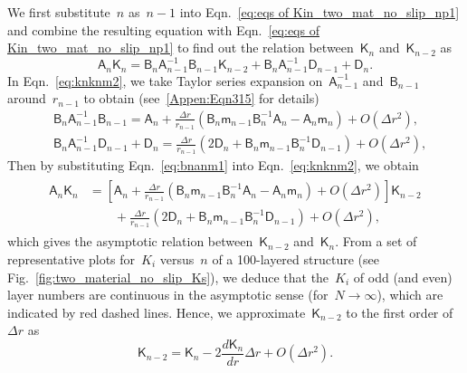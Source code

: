 \documentclass[preprint,10pt,times]{elsarticle}
\numberwithin{equation}{section}
\renewcommand{\u}[1]{\boldsymbol{#1}}
\newcommand{\usf}[1]{\u{\mathsf #1}}
\renewcommand{\>}{$\Rightarrow$}
\begin{document}
We first substitute~$n$ as~$n-1$ into Eqn.~\eqref{eq:eqs of Kin_two_mat_no_slip_np1} and combine the resulting equation with Eqn.~\eqref{eq:eqs of Kin_two_mat_no_slip_np1} to find out the relation between~$\usf{K}_{n}$ and~$\usf{K}_{n-2}$ as
\begin{equation}
	\usf{A}_n \usf{K}_n  = \usf{B}_n \usf{A}^{-1}_{n-1} \usf{B}_{n-1} \usf{K}_{n-2} + \usf{B}_n \usf{A}^{-1}_{n-1} \usf{D}_{n-1}  + \usf{D}_n .
	\label{eq:knknm2}
\end{equation}
In Eqn.~\eqref{eq:knknm2}, we take Taylor series expansion on~$\usf{A}^{-1}_{n-1}$ and~$\usf{B}_{n-1}$ around~$r_{n-1}$ to obtain (see~\ref{Appen:Eqn315} for details)
\begin{subequations}
	\begin{align}
	& \usf{B}_n \usf{A}^{-1}_{n-1} \usf{B}_{n-1} = \usf{A}_n + \frac{\Delta r}{r_{n-1}} \left( \usf{B}_n \usf{m}_{n-1} \usf{B}^{-1}_n \usf{A}_n - \usf{A}_n \usf{m}_n \right)  + O(\Delta r^2), \\
	& \usf{B}_n \usf{A}^{-1}_{n-1} \usf{D}_{n-1} + \usf{D}_n = \frac{\Delta r}{r_{n-1}} \left( 2\usf{D}_n + \usf{B}_n \usf{m}_{n-1} \usf{B}^{-1}_n \usf{D}_{n-1} \right) + O(\Delta r^2),
	\end{align}
	\label{eq:bnanm1}
\end{subequations}
Then by substituting Eqn.~\eqref{eq:bnanm1} into Eqn.~\eqref{eq:knknm2}, we obtain
\begin{equation}
\begin{aligned}
	\begin{split}
	\usf{A}_n \usf{K}_n & = \left[  \usf{A}_n + \frac{\Delta r}{r_{n-1}} \left( \usf{B}_n \usf{m}_{n-1} \usf{B}^{-1}_n \usf{A}_n - \usf{A}_n \usf{m}_n \right)  + O(\Delta r^2) \right] \usf{K}_{n-2} \\
	& \qquad + \frac{\Delta r}{r_{n-1}} \left( 2\usf{D}_n + \usf{B}_n \usf{m}_{n-1} \usf{B}^{-1}_n \usf{D}_{n-1} \right) + O(\Delta r^2),
	\end{split}
\end{aligned}
\label{eq:knknm2appr1}
\end{equation}
which gives the asymptotic relation between~$\usf{K}_{n-2}$ and~$\usf{K}_n$.
From a set of representative plots for~$K_{i}$ versus~$n$ of a 100-layered structure (see Fig.~\ref{fig:two_material_no_slip_Ks}), we deduce that the~$K_{i}$ of odd (and even) layer numbers are continuous in the asymptotic sense (for~$N \to \infty$), which are indicated by red dashed lines. Hence, we approximate~$\usf{K}_{n-2}$ to the first order of~$\Delta r$ as
\begin{equation}
	\usf{K}_{n-2} = \usf{K}_n - 2\frac{d\usf{K}_n}{dr} \Delta r + O(\Delta r^2).
	\label{eq:knknm2appr2}
\end{equation}
\end{document}
